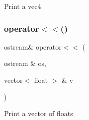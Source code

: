 Print a vec4 \mbox{\label{cout-definitions_8hpp_a337249c538c5d8304a68a31ecc936c81}} 
\subsubsection{\texorpdfstring{operator$<$$<$()}{operator<<()}\hspace{0.1cm}{\footnotesize\ttfamily [4/4]}}
{\footnotesize\ttfamily ostream\& operator$<$$<$ (\begin{DoxyParamCaption}\item[{ostream \&}]{os,  }\item[{vector$<$ float $>$ \&}]{v }\end{DoxyParamCaption})}

Print a vector of floats 